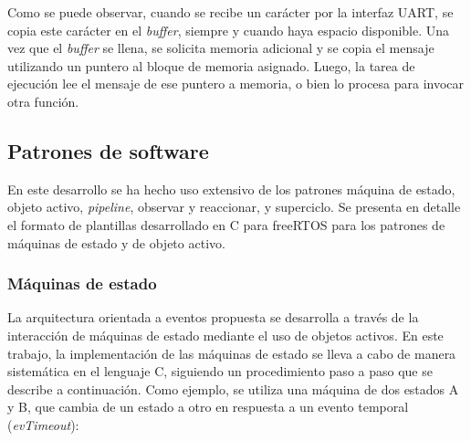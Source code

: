 Como se puede observar, cuando se recibe un carácter por la interfaz UART, se copia este carácter en el \textit{buffer}, siempre y cuando haya espacio disponible. Una vez que el \textit{buffer} se llena, se solicita memoria adicional y se copia el mensaje utilizando un puntero al bloque de memoria asignado. Luego, la tarea de ejecución lee el mensaje de ese puntero a memoria, o bien lo procesa para invocar otra función.\\


\subsection{Patrones de software}
En este desarrollo se ha hecho uso extensivo de los patrones máquina de estado, objeto activo, \textit{pipeline}, observar y reaccionar, y superciclo. Se presenta en detalle el formato de plantillas desarrollado en C para freeRTOS para los patrones de máquinas de estado y de objeto activo. \\

\subsubsection{Máquinas de estado}
La arquitectura orientada a eventos propuesta se desarrolla a través de la interacción de máquinas de estado mediante el uso de objetos activos. En este trabajo, la implementación de las máquinas de estado se lleva a cabo de manera sistemática en el lenguaje C, siguiendo un procedimiento paso a paso que se describe a continuación. Como ejemplo, se utiliza una máquina de dos estados A y B, que cambia de un estado a otro en respuesta a un evento temporal (\textit{evTimeout}):

